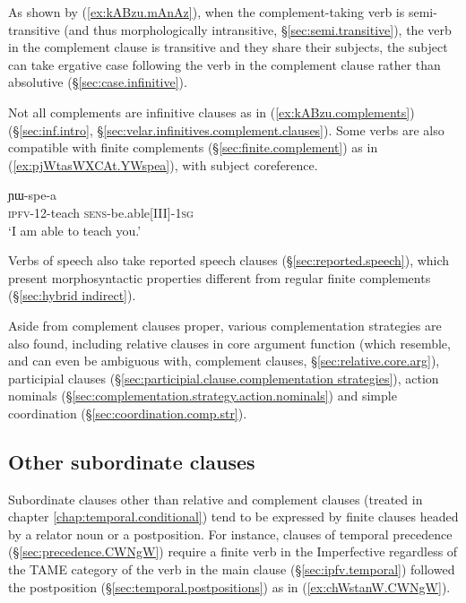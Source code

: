 As shown by (\ref{ex:kABzu.mAnAz}), when the com\-ple\-ment-taking verb is semi-transitive (and thus morphologically intransitive, §\ref{sec:semi.transitive}), the verb in the complement clause is transitive and they share their subjects, the subject can take ergative case following the verb in the complement clause rather than absolutive (§\ref{sec:case.infinitive}).

Not all complements are infinitive clauses as in (\ref{ex:kABzu.complements}) (§\ref{sec:inf.intro}, §\ref{sec:velar.infinitives.complement.clauses}). Some verbs are also compatible with finite complements (§\ref{sec:finite.complement}) as in (\ref{ex:pjWtasWXCAt.YWspea}), with subject coreference.

\begin{exe} 
\ex \label{ex:pjWtasWXCAt.YWspea}
 ɲɯ-spe-a  \\
\textsc{ipfv}-1\fl{}2-teach \textsc{sens}-be.able[III]-\textsc{1sg} \\
\glt `I am able to teach you.' 
\end{exe} 

Verbs of speech also take reported speech clauses (§\ref{sec:reported.speech}), which present morphosyntactic properties different from  regular finite complements (§\ref{sec:hybrid indirect}).

Aside from complement clauses proper, various complementation strategies are also found, including relative clauses in core argument function (which resemble, and can even be ambiguous with, complement clauses, §\ref{sec:relative.core.arg}), participial clauses (§\ref{sec:participial.clause.complementation strategies}), action nominals (§\ref{sec:complementation.strategy.action.nominals}) and simple coordination (§\ref{sec:coordination.comp.str}).

\subsection{Other subordinate clauses}
Subordinate clauses other than relative and complement clauses (treated in chapter \ref{chap:temporal.conditional}) tend to be expressed by finite clauses headed by a relator noun or a postposition. For instance, clauses of temporal precedence (§\ref{sec:precedence.CWNgW}) require a finite verb in the Imperfective regardless of the TAME category of the verb in the main clause (§\ref{sec:ipfv.temporal}) followed the postposition  (§\ref{sec:temporal.postpositions}) as in (\ref{ex:chWstanW.CWNgW}).


